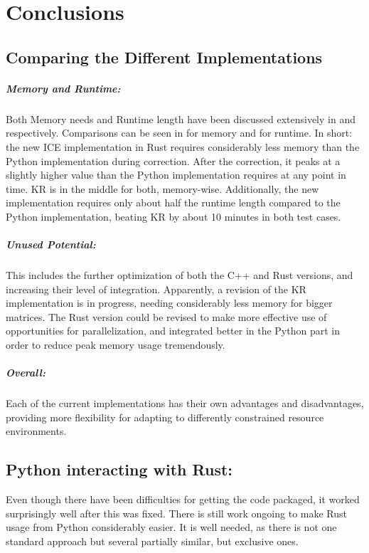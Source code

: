 \chapter{Conclusions}\label{chap:conclusion}


\section{Comparing the Different Implementations}

\paragraph{Memory and Runtime:}
Both Memory needs and Runtime length have been discussed extensively in
 and  respectively. Comparisons can be
seen in  for memory and  for runtime.
In short: the new ICE implementation in Rust requires considerably less memory
than the Python implementation during correction. After the correction, it
peaks at a slightly higher value than the Python implementation requires at any
point in time. KR is in the middle for both, memory-wise. Additionally, the new
implementation requires only about half the runtime length compared to the
Python implementation, beating KR by about 10 minutes in both test cases.


\paragraph{Unused Potential:}\label{sec:potential} This includes the further
optimization of both the C++ and Rust versions, and increasing their level of
integration. Apparently, a revision of the KR implementation is in progress,
needing considerably less memory for bigger matrices. The Rust version could be
revised to make more effective use of opportunities for parallelization, and
integrated better in the Python part in order to reduce peak memory usage
tremendously.


\paragraph{Overall:} Each of the current implementations has their own
advantages and disadvantages, providing more flexibility for adapting to
differently constrained resource environments.


\section{Python interacting with Rust:} Even though there have been
difficulties for getting the code packaged, it worked surprisingly well after
this was fixed. There is still work ongoing to make Rust usage from Python
considerably easier. It is well needed, as there is not one standard
approach but several partially similar, but exclusive ones.

